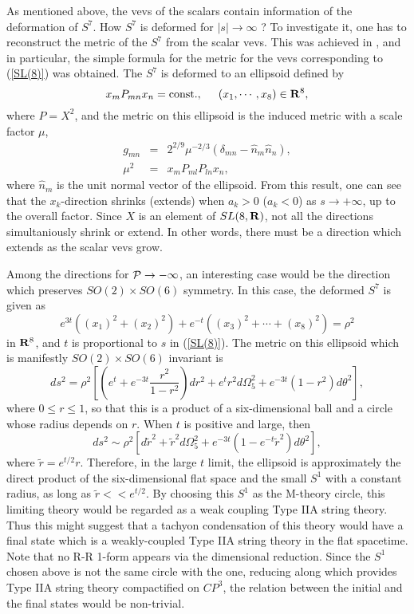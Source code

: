\documentclass[a4paper,a4paper]{article}
\begin{document}
As mentioned above, the vevs of the scalars contain information of the deformation of $S^7$. 
How $S^7$ is deformed for $|s|\to\infty$ ?
To investigate it, one has to reconstruct the metric of the $S^7$ from the scalar vevs. 
This was achieved in \cite{embedding}, and in particular, the simple formula for the metric for the vevs 
corresponding to (\ref{SL(8)}) was obtained. 
The $S^7$ is deformed to an ellipsoid defined by 
\begin{equation}
x_mP_{mn}x_n = \mbox{const.}, \hspace{5mm} (x_1,\cdots,x_8) \in {\bf R}^8,
\end{equation}
where $P=X^2$, and the metric on this ellipsoid is the induced metric with a scale factor $\mu$,
\begin{eqnarray}
g_{mn} &=& 2^{2/9}\mu^{-2/3}(\delta_{mn}-\hat{n}_m\hat{n}_n), \\
\mu^2 &=& x_mP_{ml}P_{ln}x_n,
\end{eqnarray}
where $\hat{n}_m$ is the unit normal vector of the ellipsoid. 
From this result, one can see that the $x_k$-direction shrinks (extends) when $a_k>0$ ($a_k<0$) as 
$s\to +\infty$, up to the overall factor. 
Since $X$ is an element of $SL(8,{\bf R})$, not all the directions simultaniously shrink or extend. 
In other words, there must be a direction which extends as the scalar vevs grow. 

Among the directions for ${\cal P}\to -\infty$, an interesting case would be the direction which preserves 
$SO(2)\times SO(6)$ symmetry. 
In this case, the deformed $S^7$ is given as 
\begin{equation}
e^{3t}((x_1)^2+(x_2)^2)+e^{-t}((x_3)^2+\cdots+(x_8)^2)=\rho^2
\end{equation}
in ${\bf R}^8$, and $t$ is proportional to $s$ in (\ref{SL(8)}). 
The metric on this ellipsoid which is manifestly $SO(2)\times SO(6)$ invariant is 
\begin{equation}
ds^2 = \rho^2\left[ \left(e^t+e^{-3t}\frac{r^2}{1-r^2}\right)dr^2+e^tr^2d\Omega_5^2+e^{-3t}(1-r^2)d\theta^2
       \right],
\end{equation}
where $0\le r\le1$, so that this is a product of a six-dimensional ball and a circle whose radius depends on $r$. 
When $t$ is positive and large, then 
\begin{equation}
ds^2 \sim \rho^2\left[ d\tilde{r}^2+\tilde{r}^2d\Omega_5^2+e^{-3t}(1-e^{-t}\tilde{r}^2)d\theta^2\right],
\end{equation}
where $\tilde{r}=e^{t/2}r$. 
Therefore, in the large $t$ limit, the ellipsoid is approximately the direct product of the six-dimensional flat 
space and the small $S^1$ with a constant radius, as long as $\tilde{r}<<e^{t/2}$. 
By choosing this $S^1$ as the M-theory circle, this limiting theory would be regarded as a weak coupling 
Type IIA string theory. 
Thus this might suggest that a tachyon condensation of this theory would have a final state which is a 
weakly-coupled Type IIA string theory in the flat spacetime. 
Note that no R-R 1-form appears via the dimensional reduction. 
Since the $S^1$ chosen above is not the same circle with the one, reducing along which provides Type IIA string 
theory compactified on $CP^3$, the relation between the initial and the final states would be non-trivial. 
\end{document}
